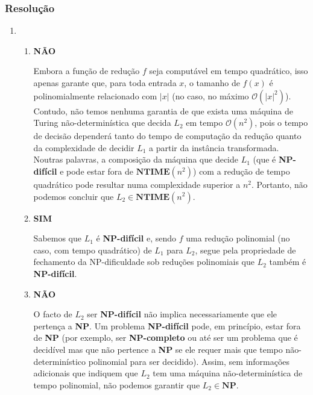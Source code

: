 \documentclass[a4paper,12pt]{article}
\begin{document}
\subsubsection*{Resolução}
\begin{enumerate}[label=\alph*)]
  \item
  \begin{enumerate}[label=\roman*)]
    \item \textbf{NÃO}
    
    \vspace{0.3cm}
    Embora a função de redução $f$ seja computável em tempo quadrático, isso apenas garante que, para toda entrada $x$, o tamanho de $f(x)$ é polinomialmente relacionado com $|x|$ (no caso, no máximo $\mathcal{O}(|x|^2)$). Contudo, não temos nenhuma garantia de que exista uma máquina de Turing não-determinística que decida $L_2$ em tempo $\mathcal{O}(n^2)$, pois o tempo de decisão dependerá tanto do tempo de computação da redução quanto da complexidade de decidir $L_1$ a partir da instância transformada. Noutras palavras, a composição da máquina que decide $L_1$ (que é \textbf{NP-difícil} e pode estar fora de $\textbf{NTIME}(n^2)$) com a redução de tempo quadrático pode resultar numa complexidade superior a $n^2$. Portanto, não podemos concluir que $L_2 \in \textbf{NTIME}(n^2)$.

    \vspace{0.5cm}
    \item \textbf{SIM}
    
    \vspace{0.3cm}
    Sabemos que $L_1$ é \textbf{NP-difícil} e, sendo $f$ uma redução polinomial (no caso, com tempo quadrático) de $L_1$ para $L_2$, segue pela propriedade de fechamento da NP-dificuldade sob reduções polinomiais que $L_2$ também é \textbf{NP-difícil}.

    \vspace{0.5cm}
    \item \textbf{NÃO}
    
    \vspace{0.3cm}
    O facto de $L_2$ ser \textbf{NP-difícil} não implica necessariamente que ele pertença a \textbf{NP}. Um problema \textbf{NP-difícil} pode, em princípio, estar fora de \textbf{NP} (por exemplo, ser \textbf{NP-completo} ou até ser um problema que é decidível mas que não pertence a \textbf{NP} se ele requer mais que tempo não-determinístico polinomial para ser decidido). Assim, sem informações adicionais que indiquem que $L_2$ tem uma máquina não-determinística de tempo polinomial, não podemos garantir que $L_2 \in \textbf{NP}$.
  \end{enumerate}


\end{enumerate}
\end{document}
